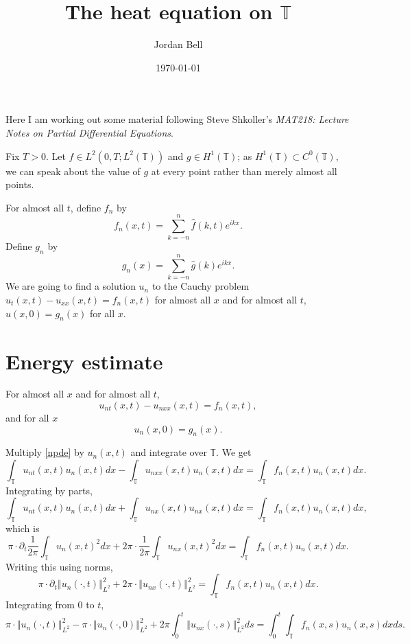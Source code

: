 \documentclass{amsart}
\newcommand{\norm}[1]{\left\Vert #1 \right\Vert}
\begin{document}
\title{The heat equation on $\mathbb{T}$}
\author{Jordan Bell}
\address{Department of Mathematics, University of Toronto, Toronto, Ontario, Canada}
\date{\today}

\maketitle

Here I am working out some material following Steve Shkoller's {\em MAT218: Lecture Notes on Partial Differential Equations}. 

Fix $T>0$. Let $f \in L^2(0,T;L^2(\mathbb{T}))$ and $g \in H^1(\mathbb{T})$; as $H^1(\mathbb{T}) \subset C^0(\mathbb{T})$, we can
speak about the value of $g$ at every point rather than merely almost all points.

For almost all $t$, define $f_n$ by
\[
f_n(x,t)=\sum_{k=-n}^n \hat{f}(k,t) e^{ikx}.
\]
Define $g_n$ by
\[
g_n(x)=\sum_{k=-n}^n \hat{g}(k) e^{ikx}.
\]
We are going to find a solution $u_n$ to the Cauchy problem $u_t(x,t)-u_{xx}(x,t)=f_n(x,t)$ for almost all $x$ and for almost all $t$, 
$u(x,0)=g_n(x)$ for all $x$. 

\section{Energy estimate}
For almost all $x$ and for almost all $t$,
\begin{equation}
u_{nt}(x,t)-u_{nxx}(x,t)=f_n(x,t),
\label{npde}
\end{equation}
and for all $x$
\[
u_n(x,0)=g_n(x).
\]

Multiply \eqref{npde} by $u_n(x,t)$ and integrate over $\mathbb{T}$. We get
\[
\int_\mathbb{T} u_{nt}(x,t)u_n(x,t) dx- \int_\mathbb{T} u_{nxx}(x,t) u_n(x,t) dx = \int_\mathbb{T} f_n(x,t) u_n(x,t) dx.
\]
Integrating by parts,
\[
\int_\mathbb{T} u_{nt}(x,t) u_n(x,t) dx + \int_\mathbb{T} u_{nx}(x,t) u_{nx}(x,t) dx = \int_\mathbb{T} f_n(x,t) u_n(x,t) dx,
\]
which is
\[
\pi \cdot \partial_t \frac{1}{2\pi} \int_\mathbb{T} u_n(x,t)^2 dx + 2\pi \cdot \frac{1}{2\pi} \int_\mathbb{T} u_{nx}(x,t)^2 dx = \int_\mathbb{T} f_n(x,t) u_n(x,t) dx.
\]
Writing this using norms,
\[
\pi \cdot \partial_t \norm{u_n(\cdot,t)}_{L^2}^2 + 2\pi \cdot \norm{u_{nx}(\cdot,t)}_{L^2}^2 =  \int_\mathbb{T} f_n(x,t) u_n(x,t) dx.
\]
Integrating from $0$ to $t$,
\[
\pi \cdot \norm{u_n(\cdot,t)}_{L^2}^2 - \pi \cdot \norm{u_n(\cdot,0)}_{L^2}^2
+ 2\pi \int_0^t \norm{u_{nx}(\cdot,s)}_{L^2}^2 ds = \int_0^t  \int_\mathbb{T} f_n(x,s) u_n(x,s) dx ds.
\]
\end{document}
